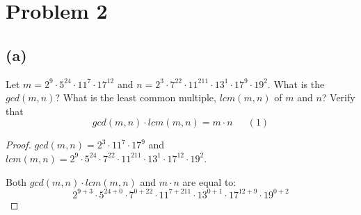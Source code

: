 \documentclass[14pt]{extarticle}
\begin{document}
\section{Problem 2}
\subsection{(a)}
Let $m = 2^9\cdot 5^{24} \cdot 11^7\cdot 17^{12}$ and $n = 2^3\cdot 7^{22}\cdot 11^{211}\cdot 13^1\cdot 17^9\cdot 19^2$. What is the $gcd(m, n)$? What is the least common multiple, $lcm(m, n)$ of $m$ and $n$? Verify that
$$
gcd(m, n)\cdot lcm(m, n) = m\cdot n \,\,\,\,\,\,\,\,\,(1)
$$
\begin{proof}
$gcd(m, n) = 2^3 \cdot 11^7 \cdot 17^9$ and $lcm(m,n) = 2^9 \cdot 5^{24} \cdot 7^{22} \cdot 11^{211} \cdot 13^1 \cdot 17^{12} \cdot 19^2$.

Both $gcd(m,n) \cdot lcm(m, n)$ and $m\cdot n$ are equal to:
$$
2^{9+3}\cdot 5^{24+0}\cdot 7^{0+22}\cdot 11^{7+211}\cdot 13^{0+1}\cdot 17^{12+9}\cdot 19^{0+2}
$$
\end{proof}
\end{document}
